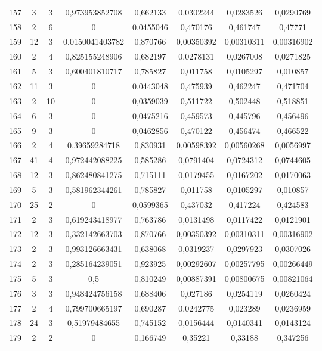 \begin{longtable}{|c|c|c|c|c|c|c|c|}
157 & 3 & 3 & 0,973953852708 & 0,662133 & 0,0302244 & 0,0283526 & 0,0290769  \\
158 & 2 & 6 & 0 & 0,0455046 & 0,470176 & 0,461747 & 0,47771  \\
159 & 12 & 3 & 0,0150041403782 & 0,870766 & 0,00350392 & 0,00310311 & 0,00316902  \\
160 & 2 & 4 & 0,825155248906 & 0,682197 & 0,0278131 & 0,0267008 & 0,0271825  \\
161 & 5 & 3 & 0,600401810717 & 0,785827 & 0,011758 & 0,0105297 & 0,010857  \\
162 & 11 & 3 & 0 & 0,0443048 & 0,475939 & 0,462247 & 0,471704  \\
163 & 2 & 10 & 0 & 0,0359039 & 0,511722 & 0,502448 & 0,518851  \\
164 & 6 & 3 & 0 & 0,0475216 & 0,459573 & 0,445796 & 0,456496  \\
165 & 9 & 3 & 0 & 0,0462856 & 0,470122 & 0,456474 & 0,466522  \\
166 & 2 & 4 & 0,39659284718 & 0,830931 & 0,00598392 & 0,00560268 & 0,0056997  \\
167 & 41 & 4 & 0,972442088225 & 0,585286 & 0,0791404 & 0,0724312 & 0,0744605  \\
168 & 12 & 3 & 0,862480841275 & 0,715111 & 0,0179455 & 0,0167202 & 0,0170063  \\
169 & 5 & 3 & 0,581962344261 & 0,785827 & 0,011758 & 0,0105297 & 0,010857  \\
170 & 25 & 2 & 0 & 0,0599365 & 0,437032 & 0,417224 & 0,424583  \\
171 & 2 & 3 & 0,619243418977 & 0,763786 & 0,0131498 & 0,0117422 & 0,0121901  \\
172 & 12 & 3 & 0,332142663703 & 0,870766 & 0,00350392 & 0,00310311 & 0,00316902  \\
173 & 2 & 3 & 0,993126663431 & 0,638068 & 0,0319237 & 0,0297923 & 0,0307026  \\
174 & 2 & 3 & 0,285164239051 & 0,923925 & 0,00292607 & 0,00257795 & 0,00266449  \\
175 & 5 & 3 & 0,5 & 0,810249 & 0,00887391 & 0,00800675 & 0,00821064  \\
176 & 3 & 3 & 0,948424756158 & 0,688406 & 0,027186 & 0,0254119 & 0,0260424  \\
177 & 2 & 4 & 0,799700665197 & 0,690287 & 0,0242775 & 0,023289 & 0,0236959  \\
178 & 24 & 3 & 0,51979484655 & 0,745152 & 0,0156444 & 0,0140341 & 0,0143124  \\
179 & 2 & 2 & 0 & 0,166749 & 0,35221 & 0,33188 & 0,347256  \\

\end{longtable}
